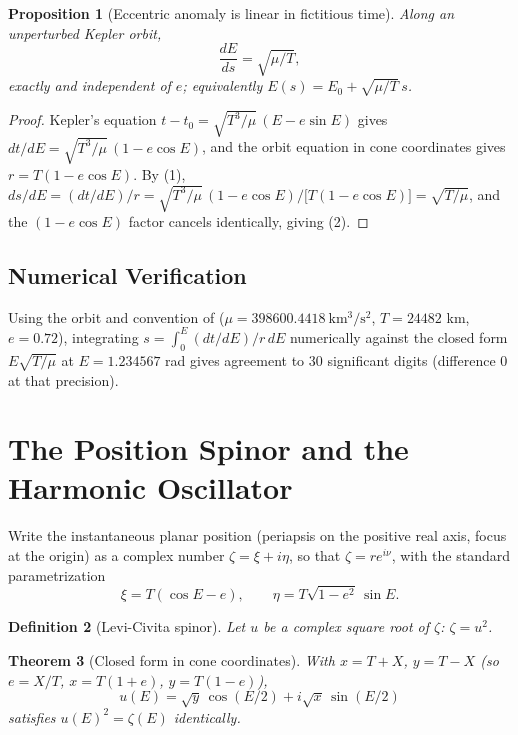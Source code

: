 \documentclass[12pt]{amsart}
\theoremstyle{plain}
\newtheorem{theorem}{Theorem}[section]
\newtheorem{proposition}[theorem]{Proposition}
\newtheorem{definition}[theorem]{Definition}
\theoremstyle{remark}
\begin{document}
\begin{proposition}[Eccentric anomaly is linear in fictitious time]\label{prop:linearE}
Along an unperturbed Kepler orbit,
\begin{equation}
\frac{dE}{ds}=\sqrt{\mu/T}, \tag{2}
\end{equation}
exactly and independent of $e$; equivalently $E(s)=E_0+\sqrt{\mu/T}\,s$.
\end{proposition}

\begin{proof}
Kepler's equation $t-t_0=\sqrt{T^3/\mu}\,(E-e\sin E)$ gives $dt/dE=\sqrt{T^3/\mu}\,(1-e\cos E)$, and the orbit equation in cone coordinates gives $r=T(1-e\cos E)$. By (1), $ds/dE=(dt/dE)/r=\sqrt{T^3/\mu}\,(1-e\cos E)\big/\big[T(1-e\cos E)\big]=\sqrt{T/\mu}$, and the $(1-e\cos E)$ factor cancels identically, giving (2). \qedhere
\end{proof}

\subsection*{Numerical Verification}

Using the orbit and convention of \cite{Ebert2026Clock} ($\mu=398600.4418\ \mathrm{km^3/s^2}$, $T=24482$ km, $e=0.72$), integrating $s=\int_0^E (dt/dE)/r\,dE$ numerically against the closed form $E\sqrt{T/\mu}$ at $E=1.234567$ rad gives agreement to $30$ significant digits (difference $0$ at that precision).

\section{The Position Spinor and the Harmonic Oscillator}

Write the instantaneous planar position (periapsis on the positive real axis, focus at the origin) as a complex number $\zeta=\xi+i\eta$, so that $\zeta=r e^{i\nu}$, with the standard parametrization
\[
\xi = T(\cos E-e), \qquad \eta = T\sqrt{1-e^2}\,\sin E.
\]

\begin{definition}[Levi-Civita spinor]
Let $u$ be a complex square root of $\zeta$: $\zeta=u^2$.
\end{definition}

\begin{theorem}[Closed form in cone coordinates]\label{thm:uclosed}
With $x=T+X$, $y=T-X$ (so $e=X/T$, $x=T(1+e)$, $y=T(1-e)$),
\begin{equation}
u(E) = \sqrt{y}\,\cos(E/2) + i\sqrt{x}\,\sin(E/2) \tag{3}
\end{equation}
satisfies $u(E)^2=\zeta(E)$ identically.
\end{theorem}
\end{document}
